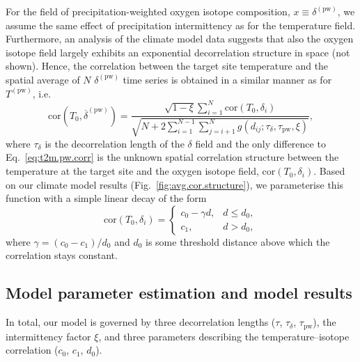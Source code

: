 \documentclass[cp, manuscript]{copernicus}
\begin{document}
For the field of precipitation-weighted oxygen isotope composition, $x \equiv
\delta^{\mathrm{(pw)}}$, we assume the same effect of precipitation
intermittency as for the temperature field. Furthermore, an analysis of the
climate model data suggests that also the oxygen isotope field largely exhibits
an exponential decorrelation structure in space (not shown). Hence, the
correlation between the target site temperature and the spatial average of $N$
$\delta^{\mathrm{(pw)}}$ time series is obtained in a similar manner as for
$T^{\mathrm{(pw)}}$, i.e.
%
\begin{equation}
\label{eq:oxy.pw.corr}
\mathrm{cor}\left(T_0,
  \overline{\delta}^{\mathrm{(pw)}}\right)=
\frac
{\sqrt{1-\xi}\sum_{i=1}^{N}\mathrm{cor}\left(T_0,\delta_i\right)}
{\sqrt{N + 2\sum_{i=1}^{N-1}\sum_{j=i+1}^{N}
  g(d_{ij}; \tau_{\delta}, \tau_{\mathrm{pw}}, \xi)}},
\end{equation}
%
where $\tau_{\delta}$ is the decorrelation length of the $\delta$ field and the
only difference to Eq.~\eqref{eq:t2m.pw.corr} is the unknown spatial correlation
structure between the temperature at the target site and the oxygen isotope
field, $\mathrm{cor}\left(T_0,\delta_i\right)$.  Based on our climate model
results (Fig.~\ref{fig:avg.cor.structure}), we parameterise this function with a
simple linear decay of the form
%
\begin{equation}
\label{eq:t2m.oxy.corr}
\mathrm{cor}\left(T_0,\delta_i\right)=
\begin{cases}
  c_0 - \gamma d, & d \le d_0,\\
  c_1, & d > d_0,
\end{cases}
\end{equation}
%
where $\gamma=(c_0-c_1)/d_0$ and $d_0$ is some threshold distance above which
the correlation stays constant.

\subsection{Model parameter estimation and model results}
\label{app:concept.model.estimation}

In total, our model is governed by three decorrelation lengths ($\tau$,
$\tau_{\delta}$, $\tau_{\mathrm{pw}}$), the intermittency factor $\xi$, and
three parameters describing the temperature--isotope correlation ($c_0$, $c_1$,
$d_0$).
\end{document}
